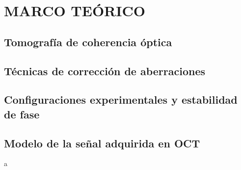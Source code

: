 \newpage
{}
\section{MARCO TEÓRICO}

\subsection{Tomografía de coherencia óptica}

\subsection{Técnicas de corrección de aberraciones}

\subsection{Configuraciones experimentales y estabilidad de fase}

\subsection{Modelo de la señal adquirida en OCT}

a